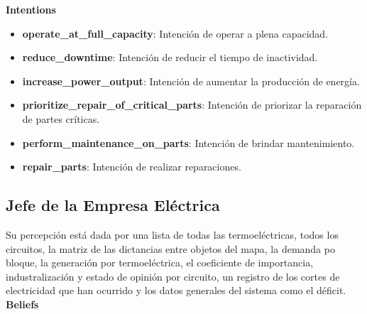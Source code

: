 \documentclass[twocolumn, fontsize=10pt]{article}
\begin{document}
\textbf{Intentions}

\begin{itemize}
  \item \textbf{operate\_at\_full\_capacity}: Intención de operar a plena capacidad.
  \item \textbf{reduce\_downtime}: Intención de reducir el tiempo de inactividad.
  \item \textbf{increase\_power\_output}: Intención de aumentar la producción de energía.
  \item \textbf{prioritize\_repair\_of\_critical\_parts}: Intención de priorizar la reparación de partes críticas.
  \item \textbf{perform\_maintenance\_on\_parts}: Intención de brindar mantenimiento.
  \item \textbf{repair\_parts}: Intención de realizar reparaciones.

\end{itemize}

\subsection{Jefe de la Empresa Eléctrica}

Su percepción está  dada por una lista de todas las termoeléctricas, todos los circuitos, la matriz de las dictancias entre objetos del mapa, la demanda po bloque, la generación por termoeléctrica, el coeficiente de importancia, industralización y estado de opinión por circuito, un registro de los cortes de electricidad que han ocurrido y los datos generales del sistema como el déficit. \\

\textbf{Beliefs}
\end{document}
